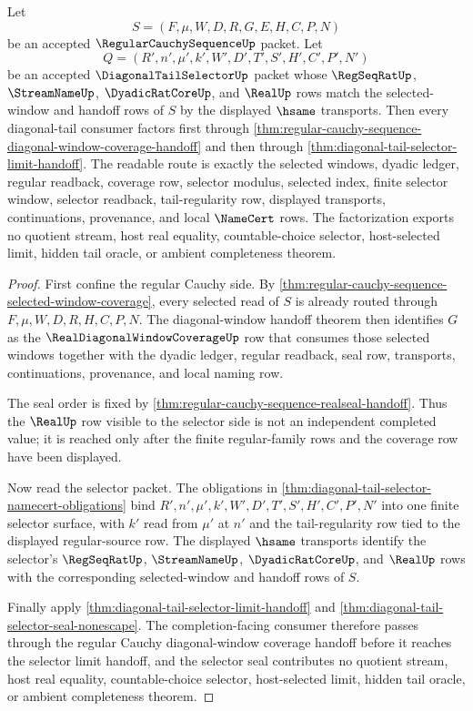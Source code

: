 \begin{theorem}
\label{thm:regular-cauchy-sequence-diagonal-tail-selector-factorization}
Let
$$
S=(F,\mu,W,D,R,G,E,H,C,P,N)
$$
be an accepted $\RegularCauchySequenceUp$ packet. Let
$$
Q=(R',n',\mu',k',W',D',T',S',H',C',P',N')
$$
be an accepted $\DiagonalTailSelectorUp$ packet whose $\RegSeqRatUp$, $\StreamNameUp$, $\DyadicRatCoreUp$, and $\RealUp$ rows match the selected-window and handoff rows of $S$ by the displayed $\hsame$ transports. Then every diagonal-tail consumer factors first through \autoref{thm:regular-cauchy-sequence-diagonal-window-coverage-handoff} and then through \autoref{thm:diagonal-tail-selector-limit-handoff}. The readable route is exactly the selected windows, dyadic ledger, regular readback, coverage row, selector modulus, selected index, finite selector window, selector readback, tail-regularity row, displayed transports, continuations, provenance, and local $\NameCert$ rows. The factorization exports no quotient stream, host real equality, countable-choice selector, host-selected limit, hidden tail oracle, or ambient completeness theorem.
\end{theorem}
\begin{proof}
First confine the regular Cauchy side. By \autoref{thm:regular-cauchy-sequence-selected-window-coverage}, every selected read of $S$ is already routed through $F,\mu,W,D,R,H,C,P,N$. The diagonal-window handoff theorem then identifies $G$ as the $\RealDiagonalWindowCoverageUp$ row that consumes those selected windows together with the dyadic ledger, regular readback, seal row, transports, continuations, provenance, and local naming row.

The seal order is fixed by \autoref{thm:regular-cauchy-sequence-realseal-handoff}. Thus the $\RealUp$ row visible to the selector side is not an independent completed value; it is reached only after the finite regular-family rows and the coverage row have been displayed.

Now read the selector packet. The obligations in \autoref{thm:diagonal-tail-selector-namecert-obligations} bind $R',n',\mu',k',W',D',T',S',H',C',P',N'$ into one finite selector surface, with $k'$ read from $\mu'$ at $n'$ and the tail-regularity row tied to the displayed regular-source row. The displayed $\hsame$ transports identify the selector's $\RegSeqRatUp$, $\StreamNameUp$, $\DyadicRatCoreUp$, and $\RealUp$ rows with the corresponding selected-window and handoff rows of $S$.

Finally apply \autoref{thm:diagonal-tail-selector-limit-handoff} and \autoref{thm:diagonal-tail-selector-seal-nonescape}. The completion-facing consumer therefore passes through the regular Cauchy diagonal-window coverage handoff before it reaches the selector limit handoff, and the selector seal contributes no quotient stream, host real equality, countable-choice selector, host-selected limit, hidden tail oracle, or ambient completeness theorem.
\end{proof}

